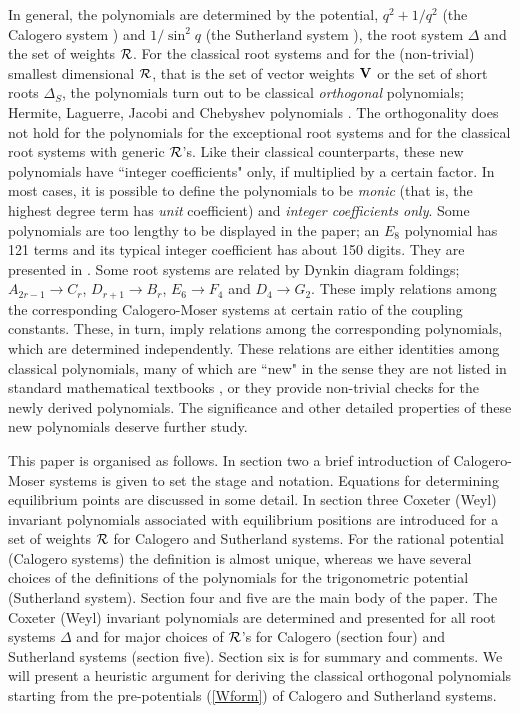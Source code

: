 \documentclass[a4paper,12pt]{article}
\begin{document}
In general, the polynomials are determined by the potential,
$q^2+1/q^2$ (the Calogero system \cite{Cal}) and $1/\sin^2q$ (the
Sutherland system \cite{Sut}), the root system $\Delta$
and the set of weights ${\cal R}$. For the classical root systems and for
the (non-trivial) smallest dimensional ${\cal R}$, that is the set of
vector weights ${\bf V}$ or the set of short roots $\Delta_S$,
the polynomials turn out to be classical {\em orthogonal\/}
polynomials; Hermite, Laguerre, Jacobi and Chebyshev polynomials \cite{szego}.
The orthogonality does not hold for the polynomials for the exceptional root
systems and for the classical root systems with generic ${\cal R}$'s.
Like their classical counterparts, these new polynomials
have ``integer coefficients" only, if multiplied by a certain factor.
In most cases, it is possible to define the polynomials to be {\em
monic\/} (that is, the  highest degree term has {\em unit\/}
coefficient) and {\em integer coefficients only}.
Some polynomials are too lengthy to be displayed in the paper;
an $E_8$ polynomial has 121 terms and its  typical integer
coefficient has about 150 digits. They are presented in \cite{poly}.
Some root systems are related by Dynkin diagram foldings;
$A_{2r-1}\to C_r$, $D_{r+1}\to B_r$, $E_6\to F_4$ and $D_4\to G_2$.
These imply relations among the corresponding Calogero-Moser systems
at certain ratio of the coupling constants. These, in turn, imply
relations among the corresponding polynomials, which are determined
independently. These relations are either  identities among
classical polynomials, many of which are ``new" in the sense they are not
listed in standard mathematical textbooks \cite{szego}, or they provide 
non-trivial checks for the newly
derived polynomials. The significance and other detailed properties of
these new polynomials deserve further study.

This paper is organised as follows.
In section two a brief introduction of Calogero-Moser systems is given to
set the stage and notation. Equations for determining equilibrium points
are discussed in some detail.
In section three Coxeter (Weyl) invariant polynomials associated with
equilibrium positions are introduced for a set of weights ${\cal R}$
for Calogero and Sutherland systems. For the rational potential (Calogero
systems) the definition is almost unique, whereas we have several choices
of the definitions of the polynomials for the trigonometric potential
(Sutherland system). Section four and five are the main body of the paper.
The Coxeter (Weyl) invariant polynomials are determined and presented for all
root systems $\Delta$ and for major choices of ${\cal R}$'s for Calogero
(section four) and Sutherland systems (section five). Section six
is for summary and comments. We will present a heuristic argument for
deriving the classical orthogonal polynomials starting from the
pre-potentials (\ref{Wform}) of Calogero and Sutherland systems.
\end{document}
